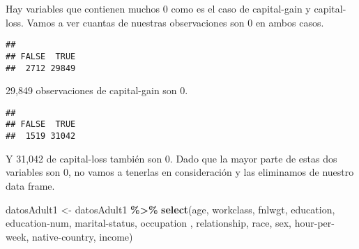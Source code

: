 \documentclass[]{article}
\newenvironment{Shaded}{\begin{snugshade}}{\end{snugshade}}
\newcommand{\DataTypeTok}[1]{\textcolor[rgb]{0.13,0.29,0.53}{#1}}
\newcommand{\DecValTok}[1]{\textcolor[rgb]{0.00,0.00,0.81}{#1}}
\newcommand{\KeywordTok}[1]{\textcolor[rgb]{0.13,0.29,0.53}{\textbf{#1}}}
\newcommand{\NormalTok}[1]{#1}
\newcommand{\OperatorTok}[1]{\textcolor[rgb]{0.81,0.36,0.00}{\textbf{#1}}}
\newcommand{\StringTok}[1]{\textcolor[rgb]{0.31,0.60,0.02}{#1}}
\begin{document}
Hay variables que contienen muchos 0 como es el caso de capital-gain y
capital-loss. Vamos a ver cuantas de nuestras observaciones son 0 en
ambos casos.

\begin{Shaded}
\end{Shaded}

\begin{verbatim}
## 
## FALSE  TRUE 
##  2712 29849
\end{verbatim}

29,849 observaciones de capital-gain son 0.

\begin{Shaded}
\end{Shaded}

\begin{verbatim}
## 
## FALSE  TRUE 
##  1519 31042
\end{verbatim}

Y 31,042 de capital-loss también son 0. Dado que la mayor parte de estas
dos variables son 0, no vamos a tenerlas en consideración y las
eliminamos de nuestro data frame.

\begin{Shaded}
\begin{Highlighting}[]
\NormalTok{datosAdult1 \textless{}{-}}\StringTok{ }\NormalTok{datosAdult1 }\OperatorTok{\%\textgreater{}\%}\StringTok{ }\KeywordTok{select}\NormalTok{(age, workclass, fnlwgt, education, }\StringTok{\textasciigrave{}}\DataTypeTok{education{-}num}\StringTok{\textasciigrave{}}\NormalTok{, }\StringTok{\textasciigrave{}}\DataTypeTok{marital{-}status}\StringTok{\textasciigrave{}}\NormalTok{, occupation}
\NormalTok{                                      , relationship, race, sex, }\StringTok{\textasciigrave{}}\DataTypeTok{hour{-}per{-}week}\StringTok{\textasciigrave{}}\NormalTok{, }\StringTok{\textasciigrave{}}\DataTypeTok{native{-}country}\StringTok{\textasciigrave{}}\NormalTok{, income)}
\end{Highlighting}
\end{Shaded}
\end{document}
